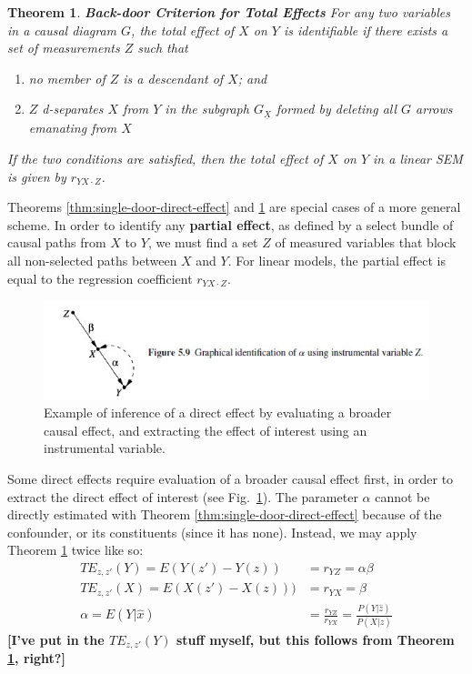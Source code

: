 \documentclass[11pt]{article}
\numberwithin{equation}{section}
\newtheorem{thm}{Theorem}[section]
\begin{document}
\begin{thm}
\textbf{Back-door Criterion for Total Effects} For any two variables in a causal diagram $G$, the total effect of $X$ on $Y$ is identifiable if there exists a set of measurements $Z$ such that 
\begin{enumerate}
\item no member of $Z$ is a descendant of $X$; and
\item $Z$ d-separates $X$ from $Y$ in the subgraph $G_{\underline{X}}$ formed by deleting all $G$ arrows emanating from $X$
\end{enumerate}
If the two conditions are satisfied, then the total effect of $X$ on $Y$ in a linear SEM is given by $r_{YX\cdot Z}$. \label{thm:back-door-total-effect}
\end{thm}

Theorems \ref{thm:single-door-direct-effect} and \ref{thm:back-door-total-effect} are special cases of a more general scheme. In order to identify any \textbf{partial effect}, as defined by a select bundle of causal paths from $X$ to $Y$, we must find a set $Z$ of measured variables that block all non-selected paths between $X$ and $Y$. For linear models, the partial effect is equal to the regression coefficient $r_{YX\cdot Z}$.

\begin{figure}
\begin{center}
\includegraphics[width=0.8\columnwidth]{figures/instrumental-variable.jpg}  
\end{center}
\caption{Example of inference of a direct effect by evaluating a broader causal effect, and extracting the effect of interest using an instrumental variable.}
\label{Fig:instrument}
\end{figure}

Some direct effects require evaluation of a broader causal effect first, in order to extract the direct effect of interest (see Fig.~\ref{Fig:instrument}). The parameter $\alpha$ cannot be directly estimated with Theorem \ref{thm:single-door-direct-effect} because of the confounder, or its constituents (since it has none). Instead, we may apply Theorem \ref{thm:back-door-total-effect} twice like so:
\begin{align}
TE_{z,z'}(Y) = E(Y(z') - Y(z)) &= r_{YZ} = \alpha \beta \\
TE_{z,z'}(X) = E(X(z') - X(z))) &= r_{YX} = \beta \\
\alpha = E(Y|\hat{x}) &= \frac{r_{YZ}}{r_{YX}} = \frac{P(Y|\hat{z})}{P(X|\hat{z})}
\end{align}
\textbf{[I've put in the $TE_{z,z'}(Y)$ stuff myself, but this follows from Theorem \ref{thm:back-door-total-effect}, right?]}
\end{document}
